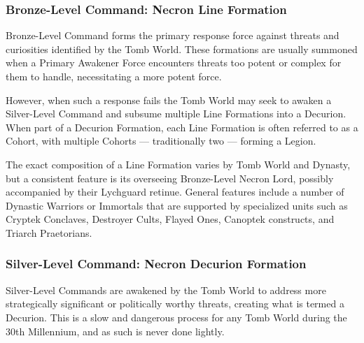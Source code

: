 \begin{multicols}{2}
\subsubsection{Bronze-Level Command: Necron Line Formation}

Bronze-Level Command forms the primary response force against threats and curiosities identified by the Tomb World. These formations are usually summoned when a Primary Awakener Force encounters threats too potent or complex for them to handle, necessitating a more potent force. 

However, when such a response fails the Tomb World may seek to awaken a Silver-Level Command and subsume multiple Line Formations into a Decurion. When part of a Decurion Formation, each Line Formation is often referred to as a Cohort, with multiple Cohorts — traditionally two — forming a Legion.

The exact composition of a Line Formation varies by Tomb World and Dynasty, but a consistent feature is its overseeing Bronze-Level Necron Lord, possibly accompanied by their Lychguard retinue. General features include a number of Dynastic Warriors or Immortals that are supported by specialized units such as Cryptek Conclaves, Destroyer Cults, Flayed Ones, Canoptek constructs, and Triarch Praetorians.


\subsubsection{Silver-Level Command: Necron Decurion Formation}

Silver-Level Commands are awakened by the Tomb World to address more strategically significant or politically worthy threats, creating what is termed a Decurion. This is a slow and dangerous process for any Tomb World during the 30th Millennium, and as such is never done lightly. 


\end{multicols}
